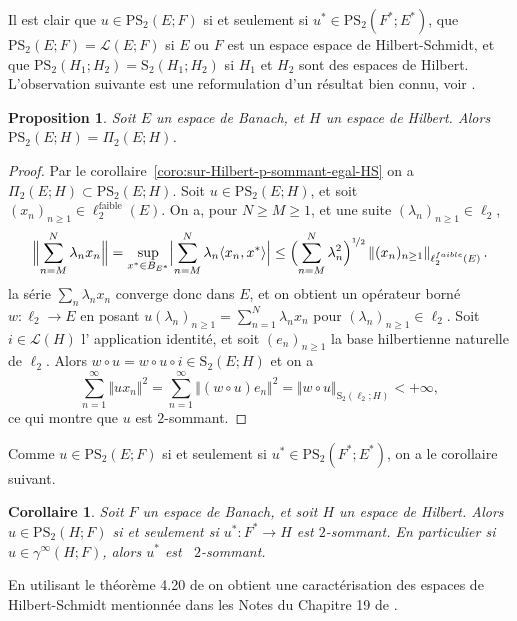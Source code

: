 \documentclass{smfart}
\theoremstyle{plain}
\newtheorem{corollary}[theorem]{Corollaire}
\newtheorem{proposition}[theorem]{Proposition}
\theoremstyle{definition}
\newcommand{\UU}{\sum \limits_{n=1}^N}
\newcommand {\FAIBLE} {\text{faible}}
\newcommand{\demi}{{\nicefrac{1}{2}}}
\newcommand {\BOUNDED} {{\mathcal L}}
\newcommand {\HS} {\mathrm{S}_2}
\newcommand {\PHS} {\mathrm{PS}_2}
\begin{document}
\noindent Il est clair que $u \in \PHS(E; F)$ si et seulement si $u^*
\in \PHS(F^*;E^*)$, que $\PHS(E; F)=\BOUNDED(E; F)$ si $E$ ou $F$ est un
espace espace de Hilbert-Schmidt, et que $\PHS(H_1;H_2)= \HS(H_1;H_2)$
si $H_1$ et $H_2$ sont des espaces de Hilbert. L'observation suivante
est une reformulation d'un résultat bien connu, voir \cite[page
50]{jvn}.

\begin{proposition} \label{prop:phs-pi2}
Soit $E$ un espace de Banach, et $H$ un espace de Hilbert. Alors $\PHS(E;H)=\Pi_2(E;H)$.
\end{proposition}

\begin{proof} Par le
  corollaire~\ref{coro:sur-Hilbert-p-sommant-egal-HS} on a $\Pi_2(E;H)
  \subset \PHS(E;H)$. Soit $u\in \PHS(E;H)$, et soit $(x_n)_{n\ge
    1}\in \ell_2^{\FAIBLE}(E)$. On a, pour $N\ge M\ge 1$, et une suite
  $(\lambda_n)_{n\ge 1} \in \ell_2$,
\[
    \Bigl \Vert \sum \limits_{n=M}^N \lambda_nx_n \Bigr \Vert 
=   \sup_{x^* \in B_{E^*}} \Bigl | \sum \limits_{n=M}^N \lambda_n\langle x_n,x^* \rangle  \Bigr | 
\le \Bigl ( \sum \limits_{n=M}^N\lambda_n^2\Bigr )^{\demi}
    \left \Vert (x_n)_{n\ge 1}\right \Vert_{\ell_2^{faible}(E)}.
\]
la série $\sum_n \lambda_nx_n$ converge donc dans
$E$, et on obtient un opérateur borné $w: \ell_2\to E$ en posant
$u(\lambda_n)_{n\ge 1}=\UU \lambda_nx_n$ pour $(\lambda_n)_{n\ge 1}\in
\ell_2$. Soit $i \in \BOUNDED(H)$ l' application identité, et soit $(e_n)_{n\ge 1}$
la base hilbertienne naturelle de $\ell_2$. Alors $w\circ u=w \circ u
\circ i \in \HS(E;H)$ et on a
\[
\sum \limits _{n=1}^{\infty}\Vert ux_n\Vert^2 =\sum
\limits_{n=1}^{\infty} \Vert (w \circ u)e_n\Vert^2 =\Vert w\circ u
\Vert_{\HS(\ell_2;H)}<+\infty,
\]
ce qui montre que $u$ est $2$-sommant.
\end{proof}


\noindent Comme $u \in \PHS(E; F)$ si et seulement si $u^* \in \PHS(F^*;E^*)$, on a le corollaire suivant.
\begin{corollary} Soit $F$ un espace de Banach, et soit $H$ un espace
  de Hilbert. Alors $u\in \PHS(H;F)$ si et seulement si $u^*:F^*\to H$
  est $2$-sommant. En particulier si $u \in \gamma^{\infty}(H;F)$,
  alors $u^*$ est \ $2$-sommant.
\end{corollary}

\noindent En utilisant le théorème 4.20 de \cite{DJT} on obtient une
caractérisation des espaces de Hilbert-Schmidt mentionnée dans les
Notes du Chapitre 19 de \cite{DJT}.
\end{document}
